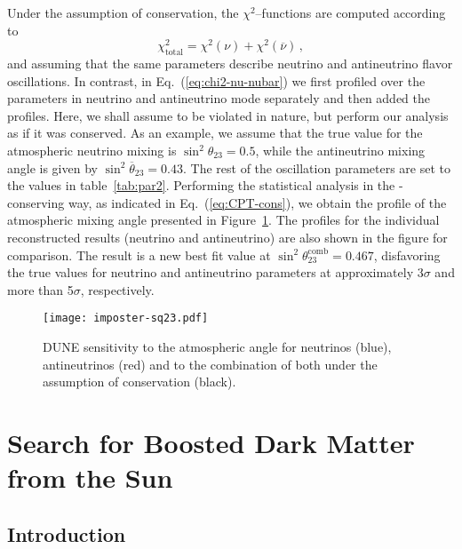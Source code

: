 Under the assumption of  conservation, the $\chi^2$--functions are computed according to
%
\begin{equation}
 \chi^2_{\text{total}}=\chi^2(\nu)+\chi^2(\overline{\nu})\, ,
 \label{eq:CPT-cons}
\end{equation}
%
and assuming that the same parameters describe neutrino and antineutrino flavor oscillations. In contrast, in Eq.~(\ref{eq:chi2-nu-nubar}) we first profiled over the parameters in neutrino and antineutrino mode separately and then added the profiles. Here, we shall assume  to be violated in nature, but perform our analysis as if it was conserved. As an example, we assume that the true value for the atmospheric neutrino mixing is $\sin^2\theta_{23}=0.5$, while the antineutrino mixing angle is given by $\sin^2\overline{\theta}_{23}=0.43$. The rest of the oscillation parameters are set to the values in table~\ref{tab:par2}. Performing the statistical analysis in the -conserving way, as indicated in Eq.~(\ref{eq:CPT-cons}), we obtain the profile of the atmospheric mixing angle presented in Figure~\ref{fig:imposter-sq23}. The profiles for the individual reconstructed results (neutrino and antineutrino) are also shown in the figure for comparison.
The result is a new best fit value at $\sin^2\theta^\text{comb}_{23}=0.467$, disfavoring the true values for neutrino and antineutrino parameters at approximately 3$\sigma$ and more than 5$\sigma$, respectively. 

\begin{figure}[!htb]
 \centering
        \texttt{[image: imposter-sq23.pdf]}
        \caption[Sensitivity to atmospheric angle for neutrinos, antineutrinos, and combination under  conservation]{DUNE sensitivity to the atmospheric angle for neutrinos (blue), antineutrinos (red) and to the combination of both under the assumption of  conservation (black).
         }
	\label{fig:imposter-sq23}
\end{figure}

\section{Search for Boosted Dark Matter from the Sun}

\subsection{\label{sec:level1}Introduction}

